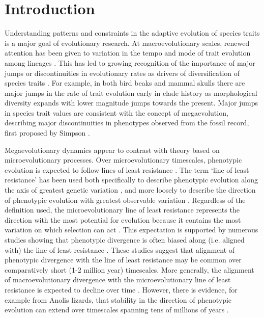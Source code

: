 \documentclass[12pt,letterpaper]{article}
\begin{document}
\section{Introduction}

Understanding patterns and constraints in the adaptive evolution of species traits is a major goal of evolutionary research. At macroevolutionary scales, renewed attention has been given to variation in the tempo and mode of trait evolution among lineages \cite{venditti2011multiple, khabbazian2016fast, castiglione2018, hansen2022, larouche2022mosaic, pagel2022general, navalon2022environmental, basu2023tempo}.
This has led to growing recognition of the importance of major jumps or discontinuities in evolutionary rates as drivers of diversification of species traits \cite{cooney2017mega, smaers2021evolution, goswami2022}.
For example, in both bird beaks and mammal skulls there are major jumps in the rate of trait evolution early in clade history as morphological diversity expands \cite{cooney2017mega, goswami2022} with lower magnitude jumps towards the present.
Major jumps in species trait values are consistent with the concept of megaevolution, describing major discontinuities in phenotypes observed from the fossil record, first proposed by Simpson \cite{simpson1944tempo,simpson1953major}.

Megaevolutionary dynamics appear to contrast with theory based on microevolutionary processes.
Over microevolutionary timescales, phenotypic evolution is expected to follow lines of least resistance \cite{schluter1996adaptive}.
The term ‘line of least resistance’ has been used both specifically to describe phenotypic evolution along the axis of greatest genetic variation \cite{schluter1996adaptive}, and more loosely to describe the direction of phenotypic evolution with greatest observable variation \cite{marroig2005size}.
Regardless of the definition used, the microevolutionary line of least resistance represents the direction with the most potential for evolution because it contains the most variation on which selection can act \cite{hansen2016, Rhoda2022, jablonski2022evolvability}.
This expectation is supported by numerous studies showing that phenotypic divergence is often biased along (i.e. aligned with) the line of least resistance \cite{marroig2005size, bolstad2014, walter2018, mcglothlin2018adaptive, tsuboi2018, Rhoda2022, mongle2022}.
These studies suggest that alignment of phenotypic divergence with the line of least resistance may be common over comparatively short (1-2 million year) timescales.
More generally, the alignment of macroevolutionary divergence with the microevolutionary line of least resistance is expected to decline over time \cite{mcglothlin2018adaptive}.
However, there is evidence, for example from Anolis lizards, that stability in the direction of phenotypic evolution can extend over timescales spanning tens of millions of years \cite{mcglothlin2018adaptive}.
\end{document}
